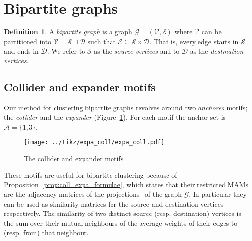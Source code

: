 \documentclass[12pt]{ociamthesis}
\theoremstyle{plain}
\theoremstyle{definition}
\newtheorem{definition}{Definition}[chapter]
\theoremstyle{remark}
\newcommand\ca[1]{\mathcal{#1}}
\begin{document}
\section{Bipartite graphs} \label{sec:bipartite_graphs}

\begin{definition}
  A \emph{bipartite graph} is a graph $\ca{G}=(\ca{V,E})$ where $\ca{V}$ can be
  partitioned into $\ca{V} = \ca{S} \sqcup \ca{D}$ such that $\ca{E} \subseteq
  \ca{S} \times \ca{D}$. That is, every edge starts in $\ca{S}$ and ends in
  $\ca{D}$. We refer to $\ca{S}$ as the \emph{source vertices} and to $\ca{D}$
  as the \emph{destination vertices}.
\end{definition}

\subsection{Collider and expander motifs} \label{sec:coll_expa}

Our method for clustering bipartite graphs revolves around two \emph{anchored}
motifs; the \emph{collider} and the \emph{expander}
(Figure~\ref{fig:expa_coll}). For each motif the anchor set is $\ca{A}=\{ 1,3
\}$.

\begin{figure}[H]
  \centering
  \texttt{[image: ../tikz/expa\_coll/expa\_coll.pdf]}
  \caption{The collider and expander motifs}
  \label{fig:expa_coll}
\end{figure}

These motifs are useful for bipartite clustering because of
Proposition~\ref{prop:coll_expa_formulae}, which states that their restricted
MAMs are the adjacency matrices of the
projections~\cite{kolaczyk2014statistical} of the graph $\ca{G}$.
In particular they can be used as similarity matrices for the source and
destination vertices respectively.
The similarity of two distinct source (resp. destination) vertices is the sum
over their mutual neighbours of the average weights of their edges to (resp.
from) that neighbour.
\end{document}
